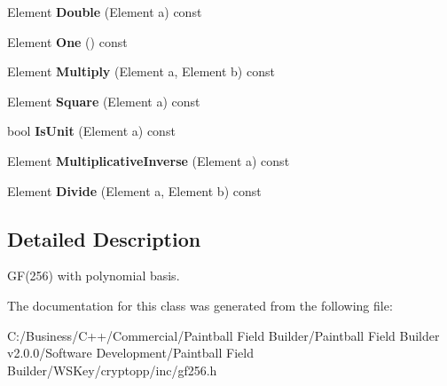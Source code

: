\begin{DoxyCompactItemize}
\item 
\hypertarget{class_g_f256_a85ff20cd9ef71d6eaa8b7b0bea55f87b}{
Element {\bfseries Double} (Element a) const }
\label{class_g_f256_a85ff20cd9ef71d6eaa8b7b0bea55f87b}

\item 
\hypertarget{class_g_f256_aaca95e2897c87bd6c575736d57c83b5f}{
Element {\bfseries One} () const }
\label{class_g_f256_aaca95e2897c87bd6c575736d57c83b5f}

\item 
\hypertarget{class_g_f256_ae5260abaafa24f8444e24e1b8f2230ab}{
Element {\bfseries Multiply} (Element a, Element b) const }
\label{class_g_f256_ae5260abaafa24f8444e24e1b8f2230ab}

\item 
\hypertarget{class_g_f256_a54682a194eedba5a69d27cf9ee2447d2}{
Element {\bfseries Square} (Element a) const }
\label{class_g_f256_a54682a194eedba5a69d27cf9ee2447d2}

\item 
\hypertarget{class_g_f256_a9f043fbb799fdd492067177e408c0d2c}{
bool {\bfseries IsUnit} (Element a) const }
\label{class_g_f256_a9f043fbb799fdd492067177e408c0d2c}

\item 
\hypertarget{class_g_f256_a3b56acf8a545ac6a14fea8350a99f927}{
Element {\bfseries MultiplicativeInverse} (Element a) const }
\label{class_g_f256_a3b56acf8a545ac6a14fea8350a99f927}

\item 
\hypertarget{class_g_f256_abcf3ca1848f3434791298e35fbef0dd6}{
Element {\bfseries Divide} (Element a, Element b) const }
\label{class_g_f256_abcf3ca1848f3434791298e35fbef0dd6}

\end{DoxyCompactItemize}


\subsection{Detailed Description}
GF(256) with polynomial basis. 

The documentation for this class was generated from the following file:\begin{DoxyCompactItemize}
\item 
C:/Business/C++/Commercial/Paintball Field Builder/Paintball Field Builder v2.0.0/Software Development/Paintball Field Builder/WSKey/cryptopp/inc/gf256.h\end{DoxyCompactItemize}
